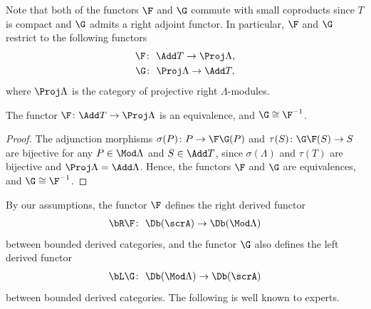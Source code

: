  Note that both of the functors $\F$ and $\G$ commute with small coproducts since $T$ is compact and $\G$ admits a right adjoint functor. In particular, $\F$ and $\G$ restrict to the following functors
 \begin{gather*}
 \F\colon\ \Add T\to\Proj\Lambda,
 \\
\G\colon\ \Proj\Lambda\to \Add T,
 \end{gather*}
where $\Proj \Lambda$ is the category of projective right $\Lambda$-modules.
\begin{lem}\label{add proj}
The functor $\F\colon\Add T\to\Proj\Lambda$ is an equivalence, and $\G\cong \F^{-1}$.
\begin{proof}
The adjunction morphisms $\sigma({P})\colon P\to \F\G(P)$ and $\tau(S)\colon \G\F(S)\to S$ are bijective for any $P\in\Mod\Lambda$ and $S\in \Add T$, since $\sigma({\Lambda})$ and $\tau({T})$ are bijective and $\Proj \Lambda=\Add \Lambda$. Hence, the functors $\F$ and $\G$ are equivalences, and $\G\cong \F^{-1}$.
\end{proof}
\end{lem}

By our assumptions, the functor $\F$ defines the right derived functor
\begin{gather*}
\bR\F\colon\ \Db(\scrA)\to \Db(\Mod\Lambda)
\end{gather*}
between bounded derived categories, and the functor $\G$ also defines the left derived functor
\begin{gather*}
\bL\G\colon\ \Db(\Mod\Lambda)\to\Db(\scrA)
\end{gather*}
between bounded derived categories.
The following is well known to experts.


